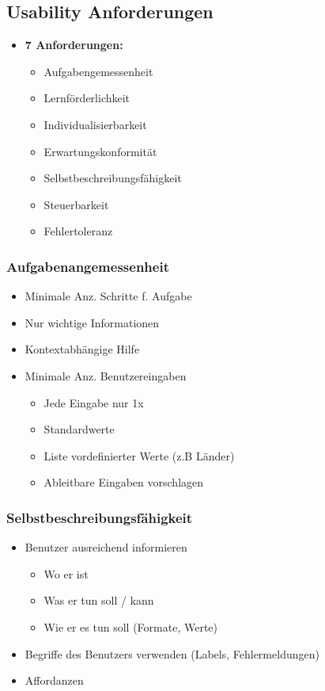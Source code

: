 \documentclass{article}
\begin{document}
\subsection{Usability Anforderungen}

\begin{itemize}
	\item \textbf{7 Anforderungen:}
	\begin{itemize}
		\item Aufgabengemessenheit
		\item Lernförderlichkeit
		\item Individualisierbarkeit
		\item Erwartungskonformität
		\item Selbstbeschreibungsfähigkeit
		\item Steuerbarkeit
		\item Fehlertoleranz
	\end{itemize}
\end{itemize}


\subsubsection{Aufgabenangemessenheit}
\begin{itemize}
	\item Minimale Anz. Schritte f. Aufgabe
	\item Nur wichtige Informationen
	\item Kontextabhängige Hilfe
	\item Minimale Anz. Benutzereingaben
	\begin{itemize}
		\item Jede Eingabe nur 1x
		\item Standardwerte
		\item Liste vordefinierter Werte (z.B Länder)
		\item Ableitbare Eingaben vorschlagen
	\end{itemize}
\end{itemize}

\subsubsection{Selbstbeschreibungsfähigkeit}
\begin{itemize}
	\item Benutzer ausreichend informieren

	\begin{itemize}
		\item Wo er ist
		\item Was er tun soll / kann
		\item Wie er es tun soll (Formate, Werte)
	\end{itemize}
	
	\item Begriffe des Benutzers verwenden (Labels, Fehlermeldungen)
	\item Affordanzen

\end{itemize}
\end{document}
